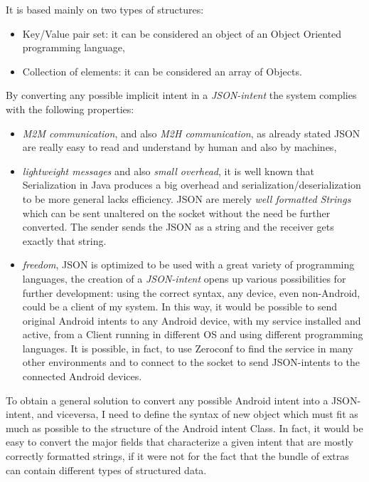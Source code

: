 It is based mainly on two types of structures:
\begin{itemize}
	\item Key/Value pair set: it can be considered an object of an Object Oriented programming language,
	\item Collection of elements: it can be considered an array of Objects.
\end{itemize}
By converting any possible implicit intent in a \textit{JSON-intent} the system complies with the following properties:
\begin{itemize}
	\item \textit{M2M communication}, and also \textit{M2H communication}, as already stated JSON are really easy to read and understand by human and also by machines,
	\item \textit{lightweight messages} and also \textit{small overhead}, it is well known that Serialization in Java produces a big overhead and serialization/deserialization to be more general lacks efficiency. JSON are merely \textit{well formatted Strings} which can be sent unaltered on the socket without the need be further converted. The sender sends the JSON as a string and the receiver gets exactly that string.
	\item \textit{freedom}, JSON is optimized to be used with a great variety of programming languages, the creation of a \textit{JSON-intent} opens up various possibilities for further development: using the correct syntax, any device, even non-Android, could be a client of my system. In this way, it would be possible to send original Android intents to any Android device, with my service installed and active, from a Client running in different OS and using different programming languages. It is possible, in fact, to use Zeroconf to find the service in many other environments and to connect to the socket to send JSON-intents to the connected Android devices.
\end{itemize}
To obtain a general solution to convert any possible Android intent into a JSON-intent, and viceversa, I need to define the syntax of new object which must fit as much as possible to the structure of the Android intent Class. In fact, it would be easy to convert the major fields that characterize a given intent that are mostly correctly formatted strings, if it were not for the fact that the bundle of extras can contain different types of structured data.
